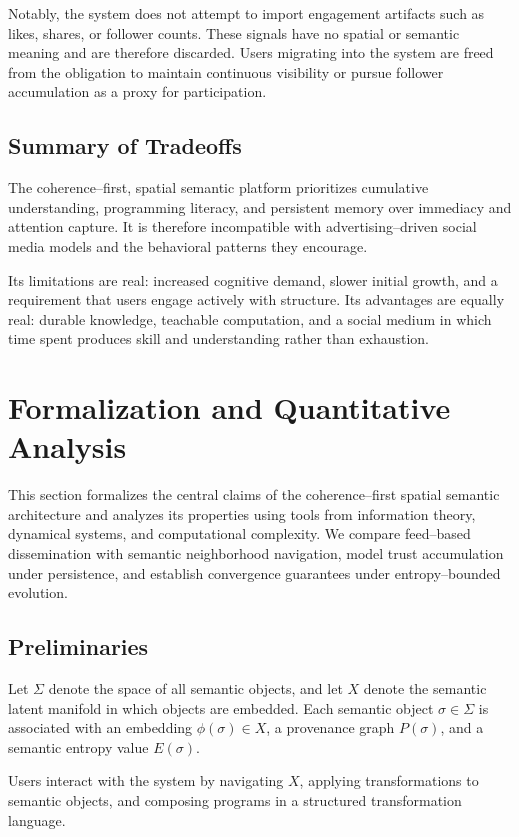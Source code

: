 \documentclass[11pt]{article}
\begin{document}
Notably, the system does not attempt to import engagement artifacts such as likes, shares,
or follower counts. These signals have no spatial or semantic meaning and are therefore
discarded. Users migrating into the system are freed from the obligation to maintain
continuous visibility or pursue follower accumulation as a proxy for participation.

\subsection{Summary of Tradeoffs}

The coherence--first, spatial semantic platform prioritizes cumulative understanding,
programming literacy, and persistent memory over immediacy and attention capture. It is
therefore incompatible with advertising--driven social media models and the behavioral
patterns they encourage.

Its limitations are real: increased cognitive demand, slower initial growth, and a
requirement that users engage actively with structure. Its advantages are equally real:
durable knowledge, teachable computation, and a social medium in which time spent produces
skill and understanding rather than exhaustion.

\section{Formalization and Quantitative Analysis}

This section formalizes the central claims of the coherence--first spatial semantic
architecture and analyzes its properties using tools from information theory, dynamical
systems, and computational complexity. We compare feed--based dissemination with semantic
neighborhood navigation, model trust accumulation under persistence, and establish
convergence guarantees under entropy--bounded evolution.

\subsection{Preliminaries}

Let $\Sigma$ denote the space of all semantic objects, and let $X$ denote the semantic
latent manifold in which objects are embedded. Each semantic object $\sigma \in \Sigma$
is associated with an embedding $\phi(\sigma) \in X$, a provenance graph $P(\sigma)$, and
a semantic entropy value $E(\sigma)$.

Users interact with the system by navigating $X$, applying transformations to semantic
objects, and composing programs in a structured transformation language.
\end{document}
